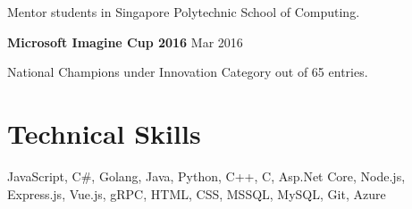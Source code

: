 \documentclass[11pt]{article} %
\begin{document}
Mentor students in Singapore Polytechnic School of Computing.

\bigskip

\textbf{Microsoft Imagine Cup 2016} \hfill Mar 2016

National Champions under Innovation Category out of 65 entries.




\section*{Technical Skills}
JavaScript, C\#, Golang, Java, Python, C++, C, Asp.Net Core, Node.js, Express.js, Vue.js, gRPC, HTML, CSS, MSSQL, MySQL, Git, Azure
\end{document}

